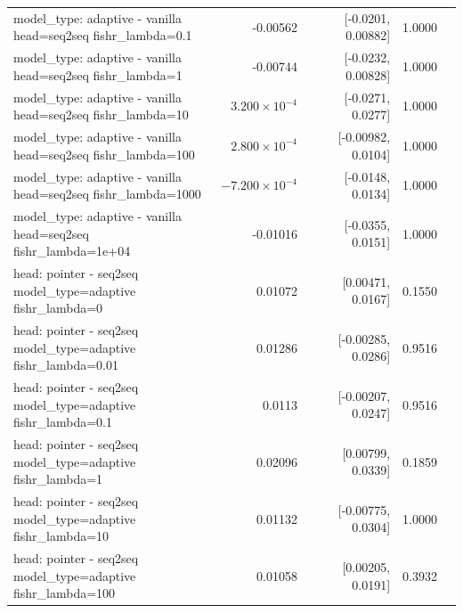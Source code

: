 \documentclass[10pt]{article}
\makeatletter
\newcommand{\stackcell}[1]{\begin{tabular}[t]{@{}l@{}}#1\end{tabular}}
\makeatother
\begin{document}
{\begin{longtable}{lrrrl}
\stackcell{model\_type: adaptive - vanilla\\\footnotesize head=seq2seq fishr\_lambda=0.1 } & -0.00562 & [-0.0201, 0.00882] & 1.0000 & \\
\stackcell{model\_type: adaptive - vanilla\\\footnotesize head=seq2seq fishr\_lambda=1 } & -0.00744 & [-0.0232, 0.00828] & 1.0000 & \\
\stackcell{model\_type: adaptive - vanilla\\\footnotesize head=seq2seq fishr\_lambda=10 } & $3.200\times10^{-4}$ & [-0.0271, 0.0277] & 1.0000 & \\
\stackcell{model\_type: adaptive - vanilla\\\footnotesize head=seq2seq fishr\_lambda=100 } & $2.800\times10^{-4}$ & [-0.00982, 0.0104] & 1.0000 & \\
\stackcell{model\_type: adaptive - vanilla\\\footnotesize head=seq2seq fishr\_lambda=1000 } & $-7.200\times10^{-4}$ & [-0.0148, 0.0134] & 1.0000 & \\
\stackcell{model\_type: adaptive - vanilla\\\footnotesize head=seq2seq fishr\_lambda=1e+04 } & -0.01016 & [-0.0355, 0.0151] & 1.0000 & \\
\stackcell{head: pointer - seq2seq\\\footnotesize model\_type=adaptive fishr\_lambda=0 } & 0.01072 & [0.00471, 0.0167] & 0.1550 & \\
\stackcell{head: pointer - seq2seq\\\footnotesize model\_type=adaptive fishr\_lambda=0.01 } & 0.01286 & [-0.00285, 0.0286] & 0.9516 & \\
\stackcell{head: pointer - seq2seq\\\footnotesize model\_type=adaptive fishr\_lambda=0.1 } & 0.0113 & [-0.00207, 0.0247] & 0.9516 & \\
\stackcell{head: pointer - seq2seq\\\footnotesize model\_type=adaptive fishr\_lambda=1 } & 0.02096 & [0.00799, 0.0339] & 0.1859 & \\
\stackcell{head: pointer - seq2seq\\\footnotesize model\_type=adaptive fishr\_lambda=10 } & 0.01132 & [-0.00775, 0.0304] & 1.0000 & \\
\stackcell{head: pointer - seq2seq\\\footnotesize model\_type=adaptive fishr\_lambda=100 } & 0.01058 & [0.00205, 0.0191] & 0.3932 & \\

\end{longtable}}
\end{document}
